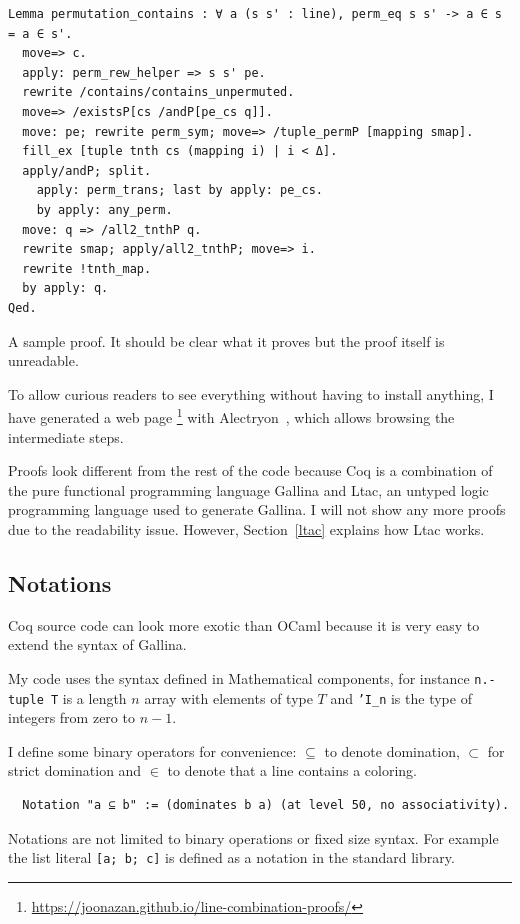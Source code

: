 \documentclass[english, 12pt, a4paper, sci, a-1b, online]{aaltothesis}
\newcommand\icoq[1]{\texttt{#1}}
\begin{document}
\begin{listing}[h]
\begin{verbatim}
Lemma permutation_contains : ∀ a (s s' : line), perm_eq s s' -> a ∈ s = a ∈ s'.
  move=> c.
  apply: perm_rew_helper => s s' pe.
  rewrite /contains/contains_unpermuted.
  move=> /existsP[cs /andP[pe_cs q]].
  move: pe; rewrite perm_sym; move=> /tuple_permP [mapping smap].
  fill_ex [tuple tnth cs (mapping i) | i < Δ].
  apply/andP; split.
    apply: perm_trans; last by apply: pe_cs.
    by apply: any_perm.
  move: q => /all2_tnthP q.
  rewrite smap; apply/all2_tnthP; move=> i.
  rewrite !tnth_map.
  by apply: q.
Qed.
\end{verbatim}
\caption{A sample proof. It should be clear what it proves but the proof itself is unreadable.}
\end{listing}

To allow curious readers to see everything without having to install anything, I have generated a web page \footnote{\url{https://joonazan.github.io/line-combination-proofs/}} with Alectryon~\cite{alectryon}, which allows browsing the intermediate steps.

Proofs look different from the rest of the code because Coq is a combination of the pure functional programming language Gallina and Ltac, an untyped logic programming language used to generate Gallina. I will not show any more proofs due to the readability issue. However, Section~\ref{ltac} explains how Ltac works.

\subsection{Notations}

Coq source code can look more exotic than OCaml because it is very easy to extend the syntax of Gallina.

My code uses the syntax defined in Mathematical components, for instance \icoq{n.-tuple T} is a length $n$ array with elements of type $T$ and \icoq{'I_n} is the type of integers from zero to $n-1$.

I define some binary operators for convenience: $\subseteq$ to denote domination, $\subset$ for strict domination and $\in$ to denote that a line contains a coloring.
\begin{verbatim}
  Notation "a ⊆ b" := (dominates b a) (at level 50, no associativity).
\end{verbatim}

Notations are not limited to binary operations or fixed size syntax. For example the list literal \icoq{[a; b; c]} is defined as a notation in the standard library.
\end{document}
